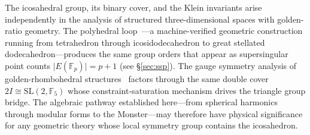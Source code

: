 \documentclass[11pt,letterpaper]{article}
\theoremstyle{definition}
\newcommand{\FF}{\mathbb{F}}
\newcommand{\abs}[1]{\lvert #1 \rvert}
\begin{document}
\begin{remarkbox}
The icosahedral group, its binary cover, and the Klein invariants arise independently in the analysis of structured three-dimensional spaces with golden-ratio geometry.  The polyhedral loop~\cite{Meucci2026loop}---a machine-verified geometric construction running from tetrahedron through icosidodecahedron to great stellated dodecahedron---produces the same group orders that appear as supersingular point counts $\abs{E(\FF_p)}=p+1$ (see \S\ref{sec:ssp}).  The gauge symmetry analysis of golden-rhombohedral structures~\cite{Meucci2025pauli,Meucci2025su3} factors through the same double cover $2I\cong\mathrm{SL}(2,\FF_5)$ whose constraint-saturation mechanism drives the triangle group bridge.  The algebraic pathway established here---from spherical harmonics through modular forms to the Monster---may therefore have physical significance for any geometric theory whose local symmetry group contains the icosahedron.
\end{remarkbox}
\end{document}

